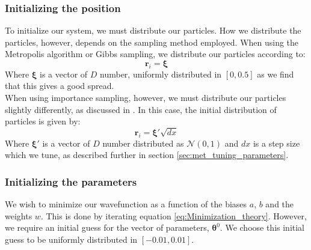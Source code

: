 \documentclass[a4paper, 10pt]{article}
\begin{document}
	\subsubsection{Initializing the position}
	To initialize our system, we must distribute our particles. How we distribute the particles, however, depends on the sampling method employed. When using the Metropolis algorithm or Gibbs sampling, we distribute our particles according to:
	\begin{equation}
	\boldsymbol{r}_i=\boldsymbol{\xi}
	\end{equation}
	Where $\boldsymbol{\xi}$ is a vector of $D$ number, uniformly distributed in $[0,0.5]$ as we find that this gives a good spread.\\
	\linebreak
	When using importance sampling, however, we must distribute our particles slightly differently, as discussed in \cite{Hjorth-Jensen2015}. In this case, the initial distribution of particles is given by:
	\begin{equation}
	\boldsymbol{r}_i=\boldsymbol{\xi'}\sqrt{dx}
	\end{equation}
	Where $\boldsymbol{\xi'}$ is a vector of $D$ number distributed as $\mathcal{N}(0,1)$ and $dx$ is a step size which we tune, as described further in section \ref{sec:met_tuning_parameters}.
	\subsubsection{Initializing the parameters}
	We wish to minimize our wavefunction as a function of the biases $a$, $b$ and  the weights $w$. This is done by iterating equation \ref{eq:Minimization_theory}. However, we require an initial guess for the vector of parameters, $\boldsymbol{\theta}^0$. We choose this initial guess to be uniformly distributed in $[-0.01, 0.01]$.
\end{document}
